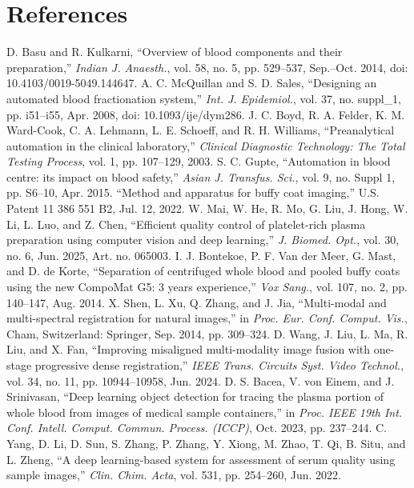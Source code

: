 \section*{References}

\begin{thebibliography}{00}

 D. Basu and R. Kulkarni, ``Overview of blood components and their preparation,'' {\it Indian J. Anaesth.}, vol. 58, no. 5, pp. 529--537, Sep.--Oct. 2014, doi: 10.4103/0019-5049.144647.
 A. C. McQuillan and S. D. Sales, ``Designing an automated blood fractionation system,'' {\it Int. J. Epidemiol.}, vol. 37, no. suppl\_1, pp. i51--i55, Apr. 2008, doi: 10.1093/ije/dym286.
 J. C. Boyd, R. A. Felder, K. M. Ward-Cook, C. A. Lehmann, L. E. Schoeff, and R. H. Williams, ``Preanalytical automation in the clinical laboratory,'' {\it Clinical Diagnostic Technology: The Total Testing Process}, vol. 1, pp. 107--129, 2003.
 S. C. Gupte, ``Automation in blood centre: its impact on blood safety,'' {\it Asian J. Transfus. Sci.}, vol. 9, no. Suppl 1, pp. S6--10, Apr. 2015.
 ``Method and apparatus for buffy coat imaging,'' U.S. Patent 11 386 551 B2, Jul. 12, 2022.
 W. Mai, W. He, R. Mo, G. Liu, J. Hong, W. Li, L. Luo, and Z. Chen, ``Efficient quality control of platelet-rich plasma preparation using computer vision and deep learning,'' {\it J. Biomed. Opt.}, vol. 30, no. 6, Jun. 2025, Art. no. 065003.
 I. J. Bontekoe, P. F. Van der Meer, G. Mast, and D. de Korte, ``Separation of centrifuged whole blood and pooled buffy coats using the new CompoMat G5: 3 years experience,'' {\it Vox Sang.}, vol. 107, no. 2, pp. 140--147, Aug. 2014.
 X. Shen, L. Xu, Q. Zhang, and J. Jia, ``Multi-modal and multi-spectral registration for natural images,'' in {\it Proc. Eur. Conf. Comput. Vis.}, Cham, Switzerland: Springer, Sep. 2014, pp. 309--324.
 D. Wang, J. Liu, L. Ma, R. Liu, and X. Fan, ``Improving misaligned multi-modality image fusion with one-stage progressive dense registration,'' {\it IEEE Trans. Circuits Syst. Video Technol.}, vol. 34, no. 11, pp. 10944--10958, Jun. 2024.
 D. S. Bacea, V. von Einem, and J. Srinivasan, ``Deep learning object detection for tracing the plasma portion of whole blood from images of medical sample containers,'' in {\it Proc. IEEE 19th Int. Conf. Intell. Comput. Commun. Process. (ICCP)}, Oct. 2023, pp. 237--244.
 C. Yang, D. Li, D. Sun, S. Zhang, P. Zhang, Y. Xiong, M. Zhao, T. Qi, B. Situ, and L. Zheng, ``A deep learning-based system for assessment of serum quality using sample images,'' {\it Clin. Chim. Acta}, vol. 531, pp. 254--260, Jun. 2022.

\end{thebibliography}
